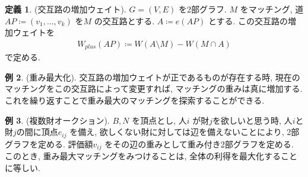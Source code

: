 \documentclass[10pt, fleqn, label-section=none]{bxjsarticle}
\theoremstyle{definition}
\newtheorem{dfn}{定義}[section]
\newtheorem{ex}[dfn]{例}
\renewcommand{\;}{\, ; \,}
\begin{document}
\begin{dfn}(交互路の増加ウェイト). $G=(V,E)$ を2部グラフ. $M$ をマッチング, 道$AP  \coloneqq (v_1, \ldots , v_k)$ を$M$ の交互路とする. $A \coloneqq e(AP)$ とする. この交互路の増加ウェイトを
\begin{align*} W_{plus}(AP) \coloneqq W(A \setminus M) - W(M \cap A )   \end{align*}
で定める. 
\end{dfn}

\begin{ex}(重み最大化). 交互路の増加ウェイトが正であるものが存在する時, 現在のマッチングをこの交互路によって変更すれば, マッチングの重みは真に増加する. これを繰り返すことで重み最大のマッチングを探索することができる. 

\end{ex}

\begin{ex}(複数財オークション). $B, N$ を頂点とし, 人$i$ が財$j$を欲しいと思う時, 人$i$と財$j$の間に頂点$e_{ij}$ を備え, 欲しくない財に対しては辺を備えないことにより, 2部グラフを定める. 評価額$v_{ij}$ をその辺の重みとして重み付き2部グラフを定める. このとき, 重み最大マッチングをみつけることは, 全体の利得を最大化することに等しい. 

\end{ex}
\end{document}
